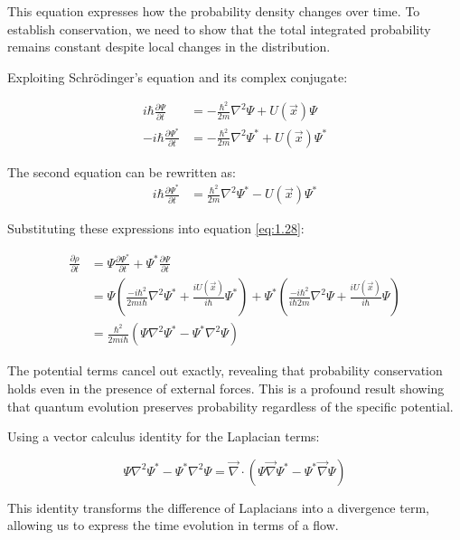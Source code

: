 \documentclass[italian]{HKNdocument}
\begin{document}
This equation expresses how the probability density changes over time. To establish conservation, we need to show that the total integrated probability remains constant despite local changes in the distribution.


Exploiting Schrödinger's equation and its complex conjugate:

\begin{align}
i \hbar \frac{\partial \Psi}{\partial t} &= -\frac{\hbar^{2}}{2 m} \nabla^{2} \Psi+U(\vec{x}) \Psi \\
-i \hbar \frac{\partial \Psi^{*}}{\partial t} &= -\frac{\hbar^{2}}{2 m} \nabla^{2} \Psi^{*}+U(\vec{x}) \Psi^{*} \label{eq:1.29}
\end{align}

The second equation can be rewritten as:
\begin{align}
i \hbar \frac{\partial \Psi^{*}}{\partial t} &= \frac{\hbar^{2}}{2 m} \nabla^{2} \Psi^{*}-U(\vec{x}) \Psi^{*}
\end{align}

Substituting these expressions into equation \eqref{eq:1.28}:

\begin{align}
\frac{\partial \rho}{\partial t} &= \Psi \frac{\partial \Psi^{*}}{\partial t}+\Psi^{*} \frac{\partial \Psi}{\partial t} \\
&= \Psi\left(\frac{-i\hbar^{2}}{2m i\hbar} \nabla^{2} \Psi^{*}+\frac{iU(\vec{x})}{i\hbar} \Psi^{*}\right)+\Psi^{*}\left(\frac{-i\hbar^{2}}{i\hbar 2 m} \nabla^{2} \Psi+\frac{iU(\vec{x})}{i\hbar} \Psi\right) \label{eq:1.30}\\
&= \frac{\hbar^{2}}{2m i\hbar}\left(\Psi \nabla^{2} \Psi^{*}-\Psi^{*} \nabla^{2} \Psi\right)
\end{align}

The potential terms cancel out exactly, revealing that probability conservation holds even in the presence of external forces. This is a profound result showing that quantum evolution preserves probability regardless of the specific potential.

Using a vector calculus identity for the Laplacian terms:

\begin{equation}
\Psi \nabla^{2} \Psi^{*}-\Psi^{*} \nabla^{2} \Psi=\vec{\nabla} \cdot\left(\Psi \vec{\nabla} \Psi^{*}-\Psi^{*} \vec{\nabla} \Psi\right) \label{eq:1.31}
\end{equation}

This identity transforms the difference of Laplacians into a divergence term, allowing us to express the time evolution in terms of a flow.
\end{document}
